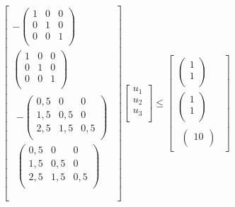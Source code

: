 \begin{equation} \label{eq23}
\begin{split}
\begin{bmatrix}
 - \begin{pmatrix}
1 & 0 & 0 \\
0 & 1 & 0 \\
0 & 0 & 1 \\
\end{pmatrix} \\
\begin{pmatrix}
1 & 0 & 0 \\
0 & 1 & 0 \\
0 & 0 & 1 \\
\end{pmatrix} \\
\begin{matrix}
 - \begin{pmatrix}
0,5 & 0 & 0 \\
1,5 & 0,5 & 0 \\
2,5 & 1,5 & 0,5 \\
\end{pmatrix} \\
\begin{pmatrix}
0,5 & 0 & 0 \\
1,5 & 0,5 & 0 \\
2,5 & 1,5 & 0,5 \\
\end{pmatrix} \\
\end{matrix} \\
\end{bmatrix}\begin{bmatrix}
u_{1} \\
u_{2} \\
u_{3} \\
\end{bmatrix} \leq \begin{bmatrix}
\begin{pmatrix}
1 \\
1 \\
\end{pmatrix} \\
\begin{pmatrix}
1 \\
1 \\
\end{pmatrix} \\
\begin{matrix}
\begin{pmatrix}
10 \\

\end{pmatrix}
\end{matrix}
\end{bmatrix}
\end{split}
\end{equation}
